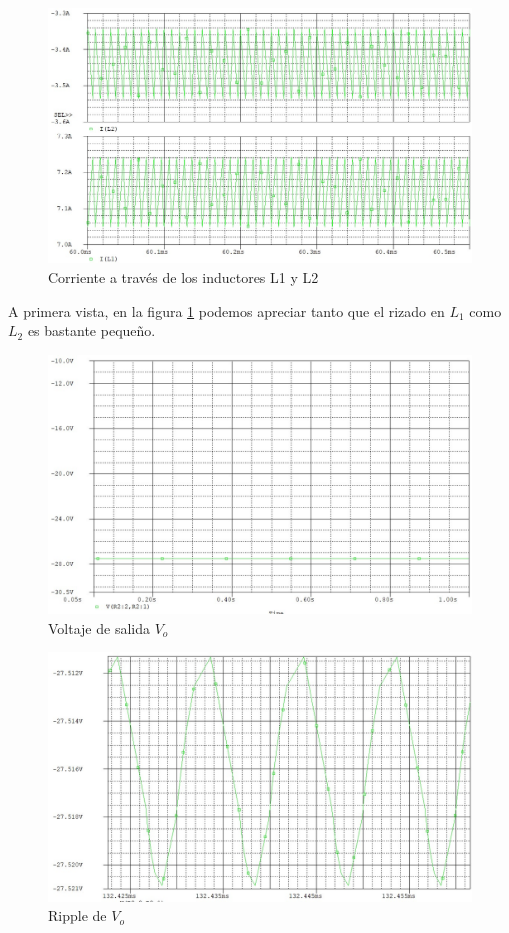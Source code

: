 \documentclass[conference]{IEEEtran}
\begin{document}
\begin{figure}[h!]
    \centering
    \includegraphics[scale=0.30]{imagenes/il1-il2.jpg}
    \caption{Corriente a través de los inductores L1 y L2}
    \label{fig: il1-il2}
\end{figure}

A primera vista, en la figura \ref{fig: il1-il2} podemos apreciar tanto que el rizado en $L_1$ como $L_2$ es bastante pequeño.

\begin{figure}[h!]
    \centering
    \includegraphics[scale=0.29]{imagenes/vo.jpg}
    \caption{Voltaje de salida $V_o$}
    \label{fig: vo}
\end{figure}

\begin{figure}[h!]
    \centering
    \includegraphics[scale=0.29]{imagenes/vo-rizado.jpg}
    \caption{Ripple de $V_o$}
    \label{fig: vo-rizado}
\end{figure}
\end{document}
